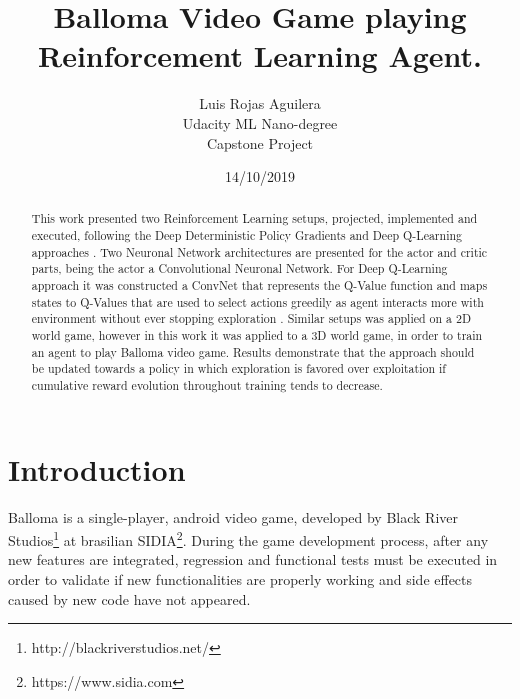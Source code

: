 \documentclass[peerreview,onecolumn]{IEEEtran}
\begin{document}
\title{Balloma Video Game playing Reinforcement Learning Agent.}



\author{Luis Rojas Aguilera \\
Udacity ML Nano-degree\\
Capstone Project\\
}
\date{14/10/2019}

\maketitle
\tableofcontents
\listoffigures
\listoftables

\IEEEpeerreviewmaketitle
\begin{abstract}


This work presented two Reinforcement Learning setups, projected, implemented and executed, following the Deep Deterministic Policy Gradients \cite{ddpg_2015} and Deep Q-Learning approaches \cite{replay_buffer_2015}. Two Neuronal Network architectures are presented for the actor and critic parts, being the actor a Convolutional Neuronal Network. For Deep Q-Learning approach it was constructed a ConvNet that represents the Q-Value function and maps states to Q-Values that are used to select actions greedily as agent interacts more with environment without ever stopping exploration . Similar setups was applied on a 2D world game, however in this work it was applied to a 3D world game, in order to train an agent to play Balloma video game. Results demonstrate that the approach should be updated towards a policy in which exploration is favored over exploitation if cumulative reward evolution throughout training tends to decrease. 
	
\end{abstract}


\section{Introduction}
Balloma is a single-player, android video game, developed by Black River Studios\footnote{http://blackriverstudios.net/} at brasilian SIDIA\footnote{https://www.sidia.com}.  During the game development process, after any new features are integrated, regression and functional tests must be executed in order to validate if new functionalities are properly working and side effects caused by new code have not appeared. 
\end{document}
